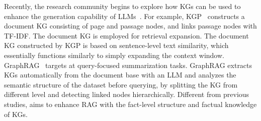 Recently, the research community begins to explore how KGs can be used to enhance the generation capability of LLMs~\cite{wang24kgp,darren24graphrag,xu24retrieval}.
For example,
KGP~\cite{wang24kgp} constructs a document KG consisting of page and passage nodes, and links passage nodes with TF-IDF. The document KG is employed for retrieval expansion. The document KG constructed by KGP is based on sentence-level text similarity, which essentially functions similarly to simply expanding the context window.
GraphRAG~\cite{darren24graphrag} targets at query-focused summarization tasks. GraphRAG extracts KGs automatically from the document base with an LLM and analyzes the semantic structure of the dataset before querying, by splitting the KG from different level and detecting linked nodes hierarchically.
Different from previous studies, \modelname aims to enhance RAG with the fact-level structure and factual knowledge of KGs.